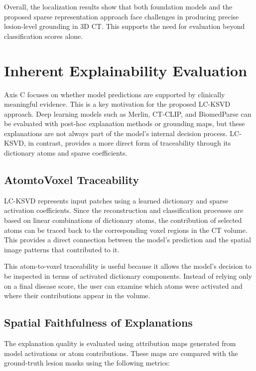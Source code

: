 Overall, the localization results show that both foundation models and the proposed sparse representation approach face challenges in producing precise lesion-level grounding in 3D CT. This supports the need for evaluation beyond classification scores alone.

\section{Inherent Explainability Evaluation}

Axis C focuses on whether model predictions are supported by clinically meaningful evidence. This is a key motivation for the proposed LC-KSVD approach. Deep learning models such as Merlin, CT-CLIP, and BiomedParse can be evaluated with post-hoc explanation methods or grounding maps, but these explanations are not always part of the model's internal decision process. LC-KSVD, in contrast, provides a more direct form of traceability through its dictionary atoms and sparse coefficients.

\subsection{AtomtoVoxel Traceability}

LC-KSVD represents input patches using a learned dictionary and sparse activation coefficients. Since the reconstruction and classification processes are based on linear combinations of dictionary atoms, the contribution of selected atoms can be traced back to the corresponding voxel regions in the CT volume. This provides a direct connection between the model's prediction and the spatial image patterns that contributed to it.

This atom-to-voxel traceability is useful because it allows the model's decision to be inspected in terms of activated dictionary components. Instead of relying only on a final disease score, the user can examine which atoms were activated and where their contributions appear in the volume.

\subsection{Spatial Faithfulness of Explanations}

The explanation quality is evaluated using attribution maps generated from model activations or atom contributions. These maps are compared with the ground-truth lesion masks using the following metrics:

